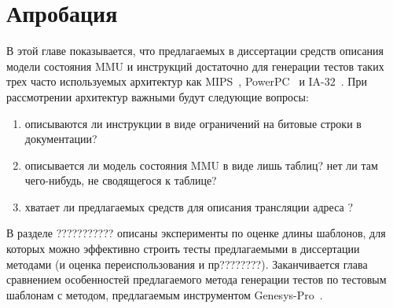 \documentclass[14pt]{extreport}
\begin{document}

\chapter{Апробация}

В этой главе показывается, что предлагаемых в диссертации средств
описания модели состояния MMU и инструкций достаточно для генерации
тестов таких трех часто используемых архитектур как MIPS~\cite{mips64_II},
PowerPC~\cite{??????????????} и IA-32~\cite{???????????????}. При
рассмотрении архитектур важными будут следующие вопросы:
\begin{enumerate}
    \item описываются ли инструкции в виде ограничений на битовые
    строки в документации?
    \item описывается ли модель состояния MMU в виде лишь таблиц? нет ли там
чего-нибудь, не сводящегося к таблице?
    \item хватает ли предлагаемых средств для описания трансляции адреса ?
\end{enumerate}

В разделе ??????????? описаны эксперименты по оценке длины шаблонов, для
которых можно эффективно строить тесты предлагаемыми в диссертации
методами (и оценка переиспользования и пр????????). Заканчивается глава
сравнением особенностей предлагаемого метода генерации тестов по
тестовым шаблонам с методом, предлагаемым инструментом
Genesys-Pro~\cite{????????????????}.

\end{document}
